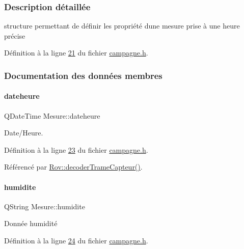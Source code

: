 \subsubsection{Description détaillée}
structure permettant de définir les propriété d\textquotesingle{}une mesure prise à une heure précise 

Définition à la ligne \hyperlink{campagne_8h_source_l00021}{21} du fichier \hyperlink{campagne_8h_source}{campagne.\+h}.



\subsubsection{Documentation des données membres}
\mbox{\label{struct_mesure_a9958b0440aca6af40028e742123afd9e}} 
\paragraph{\texorpdfstring{dateheure}{dateheure}}
{\footnotesize\ttfamily Q\+Date\+Time Mesure\+::dateheure}



Date/\+Heure. 



Définition à la ligne \hyperlink{campagne_8h_source_l00023}{23} du fichier \hyperlink{campagne_8h_source}{campagne.\+h}.



Référencé par \hyperlink{rov_8cpp_source_l00086}{Rov\+::decoder\+Trame\+Capteur()}.

\mbox{\label{struct_mesure_ad354ba4d8a32c05600859c76a8af0282}} 
\paragraph{\texorpdfstring{humidite}{humidite}}
{\footnotesize\ttfamily Q\+String Mesure\+::humidite}



Donnée humidité 



Définition à la ligne \hyperlink{campagne_8h_source_l00024}{24} du fichier \hyperlink{campagne_8h_source}{campagne.\+h}.



